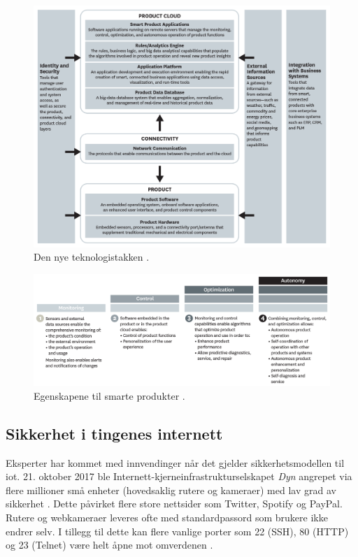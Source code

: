 \begin{figure}
\includegraphics[width=1.1\textwidth,center]{fig/harvard_technology}
\caption{Den nye teknologistakken \citep{iot_harvard_smart}.}
\label{fig:iot_harvard_smart}
\end{figure}

\begin{figure}
\includegraphics[width=1.1\textwidth,center]{fig/harvard_capabilities}
\caption{Egenskapene til smarte produkter \citep{iot_harvard_smart}.}
\label{fig:iot_harvard_capabilities}
\end{figure}


\subsection{Sikkerhet i tingenes internett}
Eksperter har kommet med innvendinger når det gjelder sikkerhetsmodellen til \gls{iot}.
21. oktober 2017 ble Internett-kjerneinfrastrukturselskapet \textit{Dyn} angrepet via flere millioner
små enheter (hovedsaklig rutere og kameraer) med lav grad av sikkerhet \citep{iot_attack_ddos}.
Dette påvirket flere store nettsider som Twitter, Spotify og PayPal. Rutere og webkameraer leveres
ofte med standardpassord som brukere ikke endrer selv. I tillegg til dette kan flere vanlige
porter som 22 (SSH), 80 (HTTP) og 23 (Telnet) være helt åpne mot omverdenen \citep{iot_mirai_botnet}.

